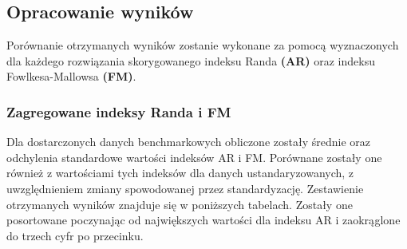 \documentclass[]{article}
\begin{document}
\subsection{Opracowanie wyników}\label{opracowanie-wynikow}

Porównanie otrzymanych wyników zostanie wykonane za pomocą wyznaczonych
dla każdego rozwiązania skorygowanego indeksu Randa \textbf{(AR)} oraz
indeksu Fowlkesa-Mallowsa \textbf{(FM)}.

\subsubsection{Zagregowane indeksy Randa i
FM}\label{zagregowane-indeksy-randa-i-fm}

Dla dostarczonych danych benchmarkowych obliczone zostały średnie oraz
odchylenia standardowe wartości indeksów AR i FM. Porównane zostały one
również z wartościami tych indeksów dla danych ustandaryzowanych, z
uwzględnieniem zmiany spowodowanej przez standardyzację. Zestawienie
otrzymanych wyników znajduje się w poniższych tabelach. Zostały one
posortowane poczynając od największych wartości dla indeksu AR i
zaokrąglone do trzech cyfr po przecinku.
\end{document}
